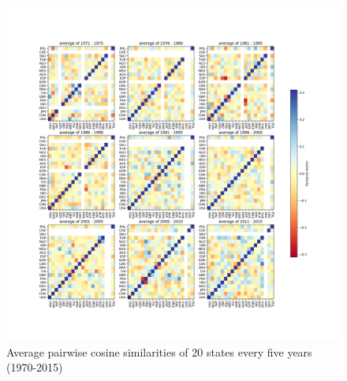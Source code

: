 \documentclass[final,authoryear,3p,12pt,times,hidelinks]{elsarticle}
\begin{document}
\begin{figure}[ht!]
  \begin{center}
    \includegraphics[trim=75 75 75 75, width=\textwidth]{graphs/doc2vec_consine_similarity_average_dynamics.png}
    \caption{Average pairwise cosine similarities of 20 states every five years (1970-2015)}
    \label{fig:doc2vec consine average dynamics}
  \end{center}
\end{figure}
\end{document}
